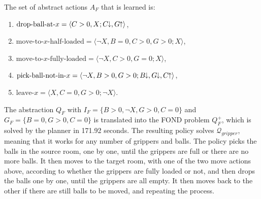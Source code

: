 \documentclass[letterpaper]{article} %
\newcommand{\tup}[1]{\langle #1 \rangle}
\newcommand{\Q}{\mathcal{Q}}
\newcommand{\abst}[2]{\tup{#1;#2}}
\newcommand{\pplus}{\hspace{-.05em}\raisebox{.15ex}{\footnotesize$\uparrow$}}
\newcommand{\mminus}{\hspace{-.05em}\raisebox{.15ex}{\footnotesize$\downarrow$}}
\begin{document}
\noindent The set of  abstract actions $A_F$  that is learned is:

\begin{enumerate}[--]
  \item $\text{drop-ball-at-$x$}=\abst{C>0, X}{C\mminus, G \pplus}$,
  \item $\text{move-to-$x$-half-loaded}\! =\!  \abst{\neg X, B=0, C>0, G\!>\!0}{X}$,
  \item $\text{move-to-$x$-fully-loaded} = \abst{\neg X, C>0, G=0}{X}$,
  \item $\text{pick-ball-not-in-$x$} = \abst{\neg X, B > 0, G > 0}{B\mminus, G\mminus, C\pplus}$,
  \item $\text{leave-$x$} = \abst{X, C=0, G > 0}{\neg X}$.
\end{enumerate}

The abstraction $Q_F$ with $I_F = \{ B>0, \neg X, G>0, C=0\}$ and $G_F = \{ B=0, G>0, C=0 \}$ is
translated into the FOND problem $Q^+_F$, which is solved by the
planner in 171.92 seconds. The resulting policy solves $\Q_{gripper}$,
meaning that it works for any  number of grippers and balls.
The policy picks the balls in the source room, one by one, 
until the grippers are full or there are no more balls.
It then moves to the target room, with one of the two move actions above, 
according to whether the grippers are fully loaded or not,
and then drops the balls one by one, until the grippers
are all empty.  It then moves back to the other if there   are still  balls
to be moved, and repeating the  process.


\end{document}
